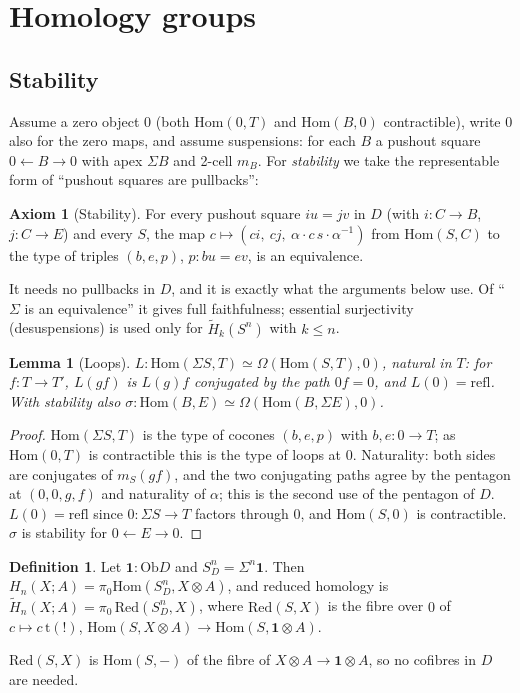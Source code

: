 \documentclass[11pt]{amsart}
\numberwithin{equation}{section}
\newtheorem{lemma}[theorem]{Lemma}
\theoremstyle{definition}
\newtheorem{definition}[theorem]{Definition}
\newtheorem{axiom}[theorem]{Axiom}
\theoremstyle{remark}
\newcommand{\Ob}{\mathrm{Ob}}
\newcommand{\Hom}{\mathrm{Hom}}
\newcommand{\one}{\mathbf{1}}
\newcommand{\tmap}{\mathrm{t}}
\begin{document}
\section{Homology groups}\label{sec:groups}

\subsection*{Stability}
Assume a zero object $0$ (both $\Hom(0,T)$ and $\Hom(B,0)$ contractible), write
$0$ also for the zero maps, and assume suspensions: for each $B$ a pushout
square $0\leftarrow B\to 0$ with apex $\Sigma B$ and 2-cell $m_B$. For
\emph{stability} we take the representable form of ``pushout squares are
pullbacks'':
\begin{axiom}[Stability]
For every pushout square $i u=j v$ in $D$ (with $i:C\to B$, $j:C\to E$) and every
$S$, the map $c\mapsto(ci,\ cj,\ \alpha\cdot c\,s\cdot\alpha^{-1})$ from
$\Hom(S,C)$ to the type of triples $(b,e,p)$, $p:bu=ev$, is an equivalence.
\end{axiom}
It needs no pullbacks in $D$, and it is exactly what the arguments below use.
Of ``$\Sigma$ is an equivalence'' it gives full faithfulness; essential
surjectivity (desuspensions) is used only for $\tilde H_k(S^n)$ with $k\le n$.

\begin{lemma}[Loops]\label{lem:loops}
$L:\Hom(\Sigma S,T)\simeq\Omega(\Hom(S,T),0)$, natural in $T$: for
$f:T\to T'$, $L(gf)$ is $L(g)f$ conjugated by the path $0f=0$, and $L(0)=\mathrm{refl}$.
With stability also $\sigma:\Hom(B,E)\simeq\Omega(\Hom(B,\Sigma E),0)$.
\end{lemma}
\begin{proof}
$\Hom(\Sigma S,T)$ is the type of cocones $(b,e,p)$ with $b,e:0\to T$; as
$\Hom(0,T)$ is contractible this is the type of loops at $0$. Naturality: both
sides are conjugates of $m_S(gf)$, and the two conjugating paths agree by the
pentagon at $(0,0,g,f)$ and naturality of $\alpha$; this is the second use of
the pentagon of $D$. $L(0)=\mathrm{refl}$ since $0:\Sigma S\to T$ factors
through $0$, and $\Hom(S,0)$ is contractible. $\sigma$ is stability for
$0\leftarrow E\to 0$.
\end{proof}

\begin{definition}
Let $\one:\Ob D$ and $S^n_D=\Sigma^n\one$. Then
$H_n(X;A)=\pi_0\Hom(S^n_D,X\otimes A)$, and reduced homology is
$\tilde H_n(X;A)=\pi_0\,\mathrm{Red}(S^n_D,X)$, where $\mathrm{Red}(S,X)$ is the
fibre over $0$ of $c\mapsto c\,\tmap(!)$, $\Hom(S,X\otimes A)\to\Hom(S,\one\otimes A)$.
\end{definition}
$\mathrm{Red}(S,X)$ is $\Hom(S,-)$ of the fibre of $X\otimes A\to \one\otimes A$, so
no cofibres in $D$ are needed.
\end{document}
